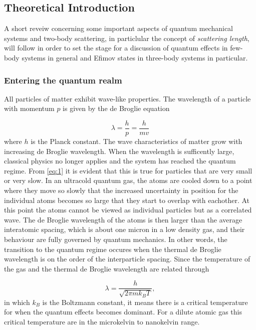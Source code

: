 \documentclass{article}
\numberwithin{equation}{section}
\numberwithin{figure}{section}
\begin{document}
\subsection{Theoretical Introduction}
A short reveiw concerning some important aspects of quantum mechanical systems and two-body scattering, in particlular the concept of \emph{scattering length}, will follow in order to set the stage for a discussion of quantum effects in few-body systems in general and Efimov states in three-body systems in particular. 

\subsubsection{Entering the quantum realm}
All particles of matter exhibit wave-like properties. The wavelength of a particle with momentum $p$ is given by the de Broglie equation

\begin{equation} \label{eq:1}
\lambda = \frac{h}{p} = \frac{h}{mv}
\end{equation}
where $h$ is the Planck constant. The wave characteristics of matter grow with increasing de Broglie wavelength. When the wavelength is sufficently large, classical physics no longer applies and the system has reached the quantum regime. From \ref{eq:1} it is evident that this is true for particles that are very small or very slow. In an ultracold quantum gas, the atoms are cooled down to a point where they move so slowly that the increased uncertainty in position for the individual atoms becomes so large that they start to overlap with eachother. At this point the atoms cannot be viewed as individual particles but as a correlated wave. The de Broglie wavelength of the atoms is then larger than the average interatomic spacing, which is about one micron in a low density gas, and their behaviour are fully governed by quantum mechanics. In other words, the transition to the quantum regime occures when the thermal de Broglie wavelength is on the order of the interparticle spacing. Since the temperature of the gas and the thermal de Broglie wavelength are related through

\begin{equation}
\lambda = \frac{h}{\sqrt{2\pi m k_B T}},
\end{equation}
in which $k_B$ is the Boltzmann constant, it means there is a critical temperature for when the quantum effects becomes dominant. For a dilute atomic gas this critical temperature are in the microkelvin to nanokelvin range.
 
\end{document}
